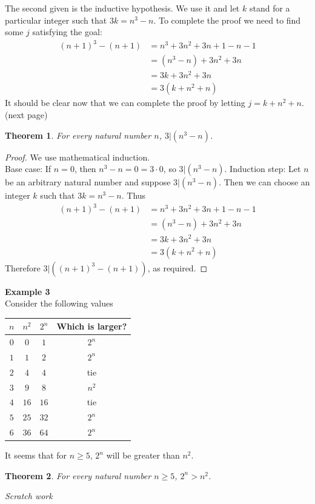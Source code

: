 \documentclass{report}
\newtheorem*{theorem}{Theorem}
\theoremstyle{definition}
\begin{document}
The second given is the inductive hypothesis. We use it and let $k$ stand for a particular integer such that $3k=n^3-n$. To complete the proof we need to find some $j$ satisfying the goal:
\begin{align*}
(n+1)^3-(n+1)&=n^3+3n^2+3n+1-n-1\\
&=(n^3-n)+3n^2+3n\\
&=3k+3n^2+3n\\
&=3(k+n^2+n)
\end{align*}
It should be clear now that we can complete the proof by letting $j=k+n^2+n$.\\
(next page)\newpage
\begin{theorem}
For every natural number $n$, $3|(n^3-n)$.
\end{theorem}
\begin{proof}
We use mathematical induction.\\
\indent Base case: If $n=0$, then $n^3-n=0=3\cdot 0$, so $3|(n^3-n)$.
\indent Induction step: Let $n$ be an arbitrary natural number and suppose 
$3|(n^3-n)$. Then we can choose an integer $k$ such that $3k=n^3-n$. Thus
\begin{align*}
(n+1)^3-(n+1)&=n^3+3n^2+3n+1-n-1\\
&=(n^3-n)+3n^2+3n\\
&=3k+3n^2+3n\\
&=3(k+n^2+n)
\end{align*}
Therefore $3|((n+1)^3-(n+1))$, as required.
\end{proof}
\noindent\textbf{Example 3}\\
Consider the following values
\begin{center}
\begin{tabular}{cccc}
$n$&$n^2$&$2^n$&Which is larger?\\
\hline
$0$&$0$&$1$&$2^n$\\
$1$&$1$&$2$&$2^n$\\
$2$&$4$&$4$&tie\\
$3$&$9$&$8$&$n^2$\\
$4$&$16$&$16$&tie\\
$5$&$25$&$32$&$2^n$\\
$6$&$36$&$64$&$2^n$\\
\end{tabular}
\end{center}
It seems that for $n\geq5$, $2^n$ will be greater than $n^2$. 
\begin{theorem}
For every natural number $n\geq5$, $2^n>n^2$.
\end{theorem}
\noindent\textit{Scratch work}\\
\end{document}
